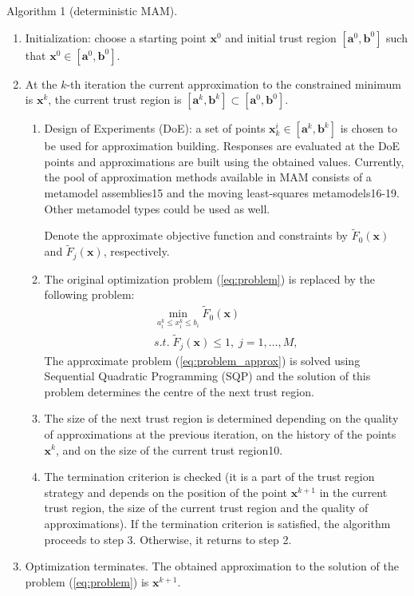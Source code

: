 \documentclass[10pt,twocolumn,a4paper]{article}
\begin{document}
Algorithm 1 (deterministic MAM).
\begin{enumerate}
\item Initialization: choose a starting point $\pmb x^0$ and initial trust region $[\pmb a^0, \pmb b^0]$ such that $\pmb x^0 \in [\pmb a^0, \pmb b^0]$.
\item At the $k$-th iteration the current approximation to the constrained minimum is $\pmb x^k$, the current trust region is $[\pmb a^k, \pmb b^k] \subset [\pmb a^0, \pmb b^0]$.
  \begin{enumerate}[label=(\alph*)]
    \item Design of Experiments (DoE): a set of points $\pmb x_k^i \in [\pmb a^k, \pmb b^k]$ is chosen to be used for approximation building. Responses are evaluated at the DoE points and approximations are built using the obtained values. Currently, the pool of approximation methods available in MAM consists of a metamodel assemblies15 and the moving least-squares metamodels16-19. Other metamodel types could be used as well.

    Denote the approximate objective function and constraints by $\widetilde{F}_0(\pmb x)$ and $\widetilde{F}_j(\pmb x)$, respectively.
    \item The original optimization problem (\ref{eq:problem}) is replaced by the following problem:
    \begin{equation}
      \label{eq:problem_approx}
      \begin{array}{c}
      \min\limits_{a_i^k \le x_i ^k\le b_i}\widetilde{F}_0(\pmb x) \\
      s.t.\; \widetilde{F}_j(\pmb x) \le 1,\; j=1,\dots ,M,
      \end{array}
    \end{equation}
    The approximate problem (\ref{eq:problem_approx}) is solved using Sequential Quadratic Programming (SQP) and the solution of this problem   determines the centre of the next trust region.
    \item The size of the next trust region is determined depending on the quality of approximations at the previous iteration, on the history of the points $\pmb x^k$, and on the size of the current trust region10.
    \item The termination criterion is checked (it is a part of the trust region strategy and depends on the position of the point $\pmb x^{k+1}$ in the current trust region, the size of the current trust region and the quality of approximations). If the termination criterion is satisfied, the algorithm proceeds to step 3. Otherwise, it returns to step 2.
  \end{enumerate}
  \item Optimization terminates. The obtained approximation to the solution of the problem (\ref{eq:problem}) is $\pmb x^{k+1}$.
\end{enumerate}
\end{document}
